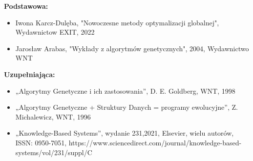 \documentclass[12pt, a4paper]{article}
\begin{document}
\textbf{Podstawowa:}
\begin{itemize}
  \item Iwona Karcz-Dulęba, "Nowoczesne metody optymalizacji globalnej", Wydawnictow EXIT, 2022
  \item Jarosław Arabas, "Wykłady z algorytmów genetycznych", 2004, Wydawnictwo WNT
\end{itemize}

\textbf{Uzupełniająca:}
\begin{itemize}
  \item „Algorytmy Genetyczne i ich zastosowania”, D. E. Goldberg, WNT, 1998
  \item „Algorytmy Genetyczne + Struktury Danych = programy ewolucyjne”, Z. Michalewicz, WNT, 1996
  \item „Knowledge-Based Systems”, wydanie 231,2021, Elsevier, wielu autorów, ISSN: 0950-7051, https://www.sciencedirect.com/journal/knowledge-based-systems/vol/231/suppl/C
\end{itemize}
\end{document}
